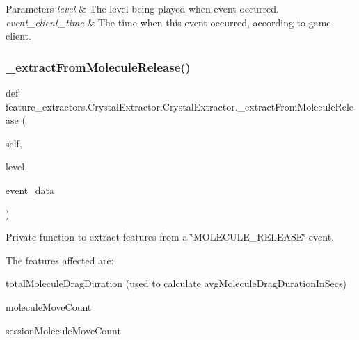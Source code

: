 \begin{DoxyParams}{Parameters}
{\em level} & The level being played when event occurred. \\
\hline
{\em event\+\_\+client\+\_\+time} & The time when this event occurred, according to game client. \\
\hline
\end{DoxyParams}
\mbox{\label{classfeature__extractors_1_1_crystal_extractor_1_1_crystal_extractor_ab8d672619c0ae4495d273406b935c112}} 
\subsubsection{\texorpdfstring{\_extractFromMoleculeRelease()}{\_extractFromMoleculeRelease()}}
{\footnotesize\ttfamily def feature\+\_\+extractors.\+Crystal\+Extractor.\+Crystal\+Extractor.\+\_\+extract\+From\+Molecule\+Release (\begin{DoxyParamCaption}\item[{}]{self,  }\item[{}]{level,  }\item[{}]{event\+\_\+data }\end{DoxyParamCaption})\hspace{0.3cm}{\ttfamily [private]}}



Private function to extract features from a \char`\"{}\+M\+O\+L\+E\+C\+U\+L\+E\+\_\+\+R\+E\+L\+E\+A\+S\+E\char`\"{} event. 

The features affected are\+:
\begin{DoxyItemize}
\item total\+Molecule\+Drag\+Duration (used to calculate avg\+Molecule\+Drag\+Duration\+In\+Secs)
\item molecule\+Move\+Count
\item session\+Molecule\+Move\+Count
\end{DoxyItemize}


